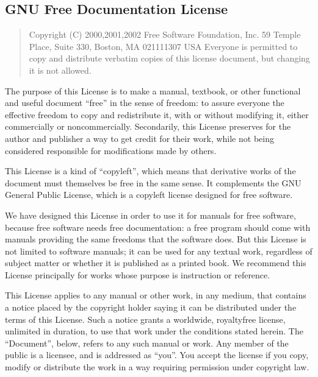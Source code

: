 \documentclass[letterpaper,10pt,english,openany,oneside]{sphinxmanual}
\begin{document}
\subsection{GNU Free Documentation License}
\label{\detokenize{docs/licenses:gnu-free-documentation-license}}\label{\detokenize{docs/licenses:gfdl}}\begin{quote}

\sphinxAtStartPar
Copyright (C) 2000,2001,2002 Free Software Foundation, Inc. 59 Temple
Place, Suite 330, Boston, MA 02111\sphinxhyphen{}1307 USA Everyone is permitted to
copy and distribute verbatim copies of this license document, but
changing it is not allowed.
\end{quote}

\sphinxAtStartPar
{}

\sphinxAtStartPar
The purpose of this License is to make a manual, textbook, or other
functional and useful document “free” in the sense of freedom: to assure
everyone the effective freedom to copy and redistribute it, with or
without modifying it, either commercially or noncommercially.
Secondarily, this License preserves for the author and publisher a way
to get credit for their work, while not being considered responsible for
modifications made by others.

\sphinxAtStartPar
This License is a kind of “copyleft”, which means that derivative works
of the document must themselves be free in the same sense. It
complements the GNU General Public License, which is a copyleft license
designed for free software.

\sphinxAtStartPar
We have designed this License in order to use it for manuals for free
software, because free software needs free documentation: a free program
should come with manuals providing the same freedoms that the software
does. But this License is not limited to software manuals; it can be
used for any textual work, regardless of subject matter or whether it is
published as a printed book. We recommend this License principally for
works whose purpose is instruction or reference.

\sphinxAtStartPar
{}

\sphinxAtStartPar
This License applies to any manual or other work, in any medium, that
contains a notice placed by the copyright holder saying it can be
distributed under the terms of this License. Such a notice grants a
world\sphinxhyphen{}wide, royalty\sphinxhyphen{}free license, unlimited in duration, to use that
work under the conditions stated herein. The “Document”, below, refers
to any such manual or work. Any member of the public is a licensee, and
is addressed as “you”. You accept the license if you copy, modify or
distribute the work in a way requiring permission under copyright law.
\end{document}
